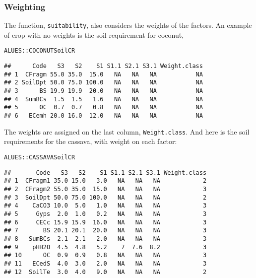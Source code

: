\documentclass[11pt,fleqn]{article}\usepackage[]{graphicx}\usepackage[]{color}
\makeatletter
\newcommand{\hlstd}[1]{\textcolor[rgb]{0.345,0.345,0.345}{#1}}%
\newenvironment{kframe}{%
 \def\at@end@of@kframe{}%
 \ifinner\ifhmode%
  \def\at@end@of@kframe{\end{minipage}}%
  \begin{minipage}{\columnwidth}%
 \fi\fi%
 \def\FrameCommand##1{\hskip\@totalleftmargin \hskip-\fboxsep
 \colorbox{shadecolor}{##1}\hskip-\fboxsep
     \hskip-\linewidth \hskip-\@totalleftmargin \hskip\columnwidth}%
 \MakeFramed {\advance\hsize-\width
   \@totalleftmargin\z@ \linewidth\hsize
   \@setminipage}}%
 {\par\unskip\endMakeFramed%
 \at@end@of@kframe}
\newenvironment{knitrout}{}{} %
\makeatother
\begin{document}
\subsubsection*{Weighting}
The function, \verb|suitability|, also considers the weights of the factors. An example of crop with no weights is the soil requirement for coconut,
\begin{knitrout}
\color{fgcolor}\begin{kframe}
\begin{alltt}
\hlstd{ALUES::COCONUTSoilCR}
\end{alltt}
\begin{verbatim}
##      Code   S3   S2    S1 S1.1 S2.1 S3.1 Weight.class
## 1  CFragm 55.0 35.0  15.0   NA   NA   NA           NA
## 2 SoilDpt 50.0 75.0 100.0   NA   NA   NA           NA
## 3      BS 19.9 19.9  20.0   NA   NA   NA           NA
## 4  SumBCs  1.5  1.5   1.6   NA   NA   NA           NA
## 5      OC  0.7  0.7   0.8   NA   NA   NA           NA
## 6   ECemh 20.0 16.0  12.0   NA   NA   NA           NA
\end{verbatim}
\end{kframe}
\end{knitrout}
The weights are assigned on the last column, \verb|Weight.class|. And here is the soil requirements for the cassava, with weight on each factor:
\begin{knitrout}
\color{fgcolor}\begin{kframe}
\begin{alltt}
\hlstd{ALUES::CASSAVASoilCR}
\end{alltt}
\begin{verbatim}
##       Code   S3   S2    S1 S1.1 S2.1 S3.1 Weight.class
## 1  CFragm1 35.0 15.0   3.0   NA   NA   NA            2
## 2  CFragm2 55.0 35.0  15.0   NA   NA   NA            3
## 3  SoilDpt 50.0 75.0 100.0   NA   NA   NA            2
## 4    CaCO3 10.0  5.0   1.0   NA   NA   NA            3
## 5     Gyps  2.0  1.0   0.2   NA   NA   NA            3
## 6     CECc 15.9 15.9  16.0   NA   NA   NA            3
## 7       BS 20.1 20.1  20.0   NA   NA   NA            3
## 8   SumBCs  2.1  2.1   2.0   NA   NA   NA            3
## 9    pHH2O  4.5  4.8   5.2    7  7.6  8.2            3
## 10      OC  0.9  0.9   0.8   NA   NA   NA            3
## 11   ECedS  4.0  3.0   2.0   NA   NA   NA            3
## 12  SoilTe  3.0  4.0   9.0   NA   NA   NA            2
\end{verbatim}
\end{kframe}
\end{knitrout}
\end{document}
